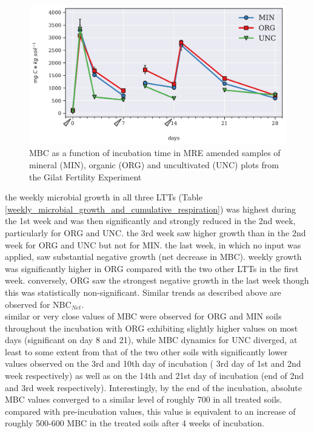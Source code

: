 			\begin{figure}[H]
				\centering
				\includegraphics[scale=0.8,width=\linewidth]{thesis_figures/main_incubation/MRE_treated/MBC.pdf}
				\caption{MBC as a function of incubation time in MRE amended samples of mineral (MIN), organic (ORG) and uncultivated (UNC) plots from the Gilat Fertility Experiment}
				\label{fig:mbc_treated_main}
			\end{figure}
			\vspace{1cm}
			\noindent
			the weekly microbial growth in all three LTTs (Table \ref{weekly_microbial_growth_and_cumulative_respiration}) was highest during the 1st week and was then significantly and strongly reduced in the 2nd week,  particularly for ORG and UNC. the 3rd week saw higher growth than in the 2nd week for ORG and UNC but not for MIN. the last week, in which no input was applied, saw substantial negative growth (net decrease in MBC). weekly growth was significantly higher in ORG compared with the two other LTTs in the first week. conversely, ORG saw the strongest negative growth in the last week though this was statistically non-significant. Similar trends as described above are observed for NBC$ _{Net} $.\\
			
			\noindent similar or very close values of MBC were observed for ORG and MIN soils throughout the incubation with ORG exhibiting slightly higher values on most days (significant on day 8 and 21), while MBC dynamics for UNC diverged, at least to some extent from that of the two other soils with significantly lower values observed on the 3rd and 10th day of incubation ( 3rd day of 1st and 2nd week respectively) as well as on the 14th and 21st day of incubation (end of 2nd and 3rd week respectively). Interestingly, by the end of the incubation, absolute MBC values converged to a similar level of roughly 700 \genericunit in all treated soils. compared with pre-incubation values, this value is equivalent to an increase of  roughly 500-600 \genericunit MBC in the treated soils after 4 weeks of incubation.\\





